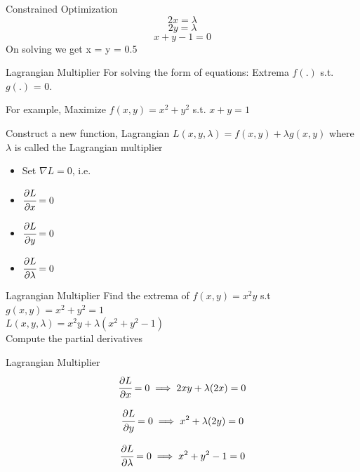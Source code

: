 \documentclass{beamer}
\begin{document}
\begin{frame}{Constrained Optimization}
\begin{equation}
2x=\lambda
\end{equation}
\begin{equation}
2y=\lambda
\end{equation}
\begin{equation}
x + y - 1 = 0
\end{equation}
On solving we get x = y = 0.5
\end{frame}


\begin{frame}{Lagrangian Multiplier}
For solving the form of equations: Extrema $f(.)$ s.t. $g(.)$ = 0.

\pause For example, Maximize $f(x, y) = x^2 + y^2$ s.t. $x + y = 1$

\pause Construct a new function, Lagrangian $L(x,y,\lambda) = f(x, y) + \lambda g(x, y)$ where $\lambda$ is called the Lagrangian multiplier 
\pause \begin{itemize}[<+->]
\item Set $\nabla L = 0$, i.e.
\item $\cfrac{\partial L}{\partial x} = 0$
\item $\cfrac{\partial L}{\partial y} = 0$
\item $\cfrac{\partial L}{\partial \lambda} = 0$
\end{itemize}

\end{frame}


\begin{frame}{Lagrangian Multiplier}
Find the extrema of $f(x,y) =x^{2}y$ s.t $g(x,y)=x^{2}+y^{2} = 1$ \\
\vspace{1em}
\pause $L (x, y, \lambda) = x^{2}y + \lambda (x^{2} + y^{2} - 1)$\\
\vspace{1em}
\pause Compute the partial derivatives
\end{frame}

\begin{frame}{Lagrangian Multiplier}
\begin{equation}
\cfrac{\partial L}{\partial x} = 0 \implies 2xy + \lambda(2x) = 0
\end{equation}

\begin{equation}
\cfrac{\partial L}{\partial y} = 0 \implies x^{2} + \lambda(2y) = 0
\end{equation}

\begin{equation}
\cfrac{\partial L}{\partial \lambda} = 0 \implies x^{2} + y^{2} - 1 = 0
\end{equation}
\end{frame}
\end{document}
